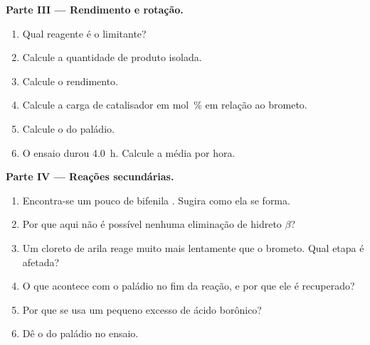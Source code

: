 \begin{problem}
\medskip
\noindent\textbf{Parte III --- Rendimento e rotação.}
\begin{enumerate}[resume]
  \item Qual reagente é o limitante?
  \item Calcule a quantidade de produto isolada.
  \item Calcule o rendimento.
  \item Calcule a carga de catalisador em mol~\% em relação ao brometo.
  \item Calcule o  do paládio.
  \item O ensaio durou \qty{4.0}{h}. Calcule a  média por hora.
\end{enumerate}

\medskip
\noindent\textbf{Parte IV --- Reações secundárias.}
\begin{enumerate}[resume]
  \item Encontra-se um pouco de bifenila . Sugira como ela se forma.
  \item Por que aqui não é possível nenhuma eliminação de hidreto $\beta$?
  \item Um cloreto de arila reage muito mais lentamente que o brometo. Qual etapa é afetada?
  \item O que acontece com o paládio no fim da reação, e por que ele é recuperado?
  \item Por que se usa um pequeno excesso de ácido borônico?
  \item Dê o  do paládio no ensaio.
\end{enumerate}
\end{problem}
